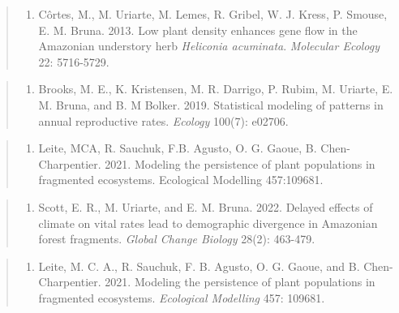 \documentclass[
  man, donotrepeattitle,floatsintext]{apa6}
\providecommand{\tightlist}{%
  \setlength{\itemsep}{0pt}\setlength{\parskip}{0pt}}
\begin{document}
\begin{quote}
\begin{enumerate}
\def\labelenumi{\arabic{enumi}.}
\setcounter{enumi}{13}
\tightlist
\item
  Côrtes, M., M. Uriarte, M. Lemes, R. Gribel, W. J. Kress, P. Smouse, E. M. Bruna. 2013. Low plant density enhances gene flow in the Amazonian understory herb \emph{Heliconia acuminata}. \emph{Molecular Ecology} 22: 5716-5729.
\end{enumerate}
\end{quote}

\begin{quote}
\begin{enumerate}
\def\labelenumi{\arabic{enumi}.}
\setcounter{enumi}{14}
\tightlist
\item
  Brooks, M. E., K. Kristensen, M. R. Darrigo, P. Rubim, M. Uriarte, E. M. Bruna, and B. M Bolker. 2019. Statistical modeling of patterns in annual reproductive rates. \emph{Ecology} 100(7): e02706.
\end{enumerate}
\end{quote}

\begin{quote}
\begin{enumerate}
\def\labelenumi{\arabic{enumi}.}
\setcounter{enumi}{15}
\tightlist
\item
  Leite, MCA, R. Sauchuk, F.B. Agusto, O. G. Gaoue, B. Chen-Charpentier. 2021. Modeling the persistence of plant populations in fragmented ecosystems. Ecological Modelling 457:109681.
\end{enumerate}
\end{quote}

\begin{quote}
\begin{enumerate}
\def\labelenumi{\arabic{enumi}.}
\setcounter{enumi}{16}
\tightlist
\item
  Scott, E. R., M. Uriarte, and E. M. Bruna. 2022. Delayed effects of climate on vital rates lead to demographic divergence in Amazonian forest fragments. \emph{Global Change Biology} 28(2): 463-479.
\end{enumerate}
\end{quote}

\begin{quote}
\begin{enumerate}
\def\labelenumi{\arabic{enumi}.}
\setcounter{enumi}{17}
\tightlist
\item
  Leite, M. C. A., R. Sauchuk, F. B. Agusto, O. G. Gaoue, and B. Chen-Charpentier. 2021. Modeling the persistence of plant populations in fragmented ecosystems. \emph{Ecological Modelling} 457: 109681.
\end{enumerate}
\end{quote}
\end{document}
